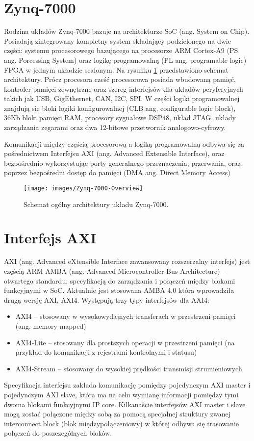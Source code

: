 \section{Zynq-7000}

Rodzina układów Zynq-7000 bazuje na architekturze SoC (ang. System on Chip). Posiadają zintegrowany kompletny system składający podzielonego na dwie części: systemu procesorowego bazującego na procesorze ARM Cortex-A9 (PS ang. Porcessing System) oraz logikę programowalną (PL ang. programable logic) FPGA w jednym układzie scalonym. Na rysunku \ref{fig:zynq7000} przedstawiono schemat architektury. Prócz procesora cześć procesorowa posiada wbudowaną pamięć, kontroler pamięci zewnętrzne oraz szereg interfejsów dla układów peryferyjnych takich jak USB, GigEthernet, CAN, I2C, SPI. W części logiki programowalnej znajdują się bloki logiki konfigurowalnej (CLB ang. configurable logic block), 36Kb bloki pamięci RAM, procesory sygnałowe DSP48, układ JTAG, układy zarządzania zegarami oraz dwa 12-bitowe przetwornik analogowo-cyfrowy.

Komunikacji między częścią procesorową a logiką programowalną odbywa się za pośrednictwem Interfejsu AXI (ang. Advanced Extensible Interface), oraz bezpośrednio wykorzystując porty generalnego przeznaczenia, przerwania, oraz poprzez bezpośredni dostęp do pamięci (DMA ang. Direct Memory Access) 

\begin{figure}[h]
    \centering
    \texttt{[image: images/Zynq-7000-Overview]}
    \caption{Schemat ogólny architektury układu Zynq-7000.}
    \label{fig:zynq7000}
\end{figure}

\section{Interfejs AXI}
 AXI (ang. Advanced eXtensible Interface zawansowany rozszerzalny interfejs) jest częścią ARM AMBA (ang. Advanced Microcontroller Bus Architecture) – otwartego standardu, specyfikacją do zarządzania i połączeń między blokami funkcyjnymi w SoC. Aktualnie jest stosowana AMBA 4.0 która wprowadziła drugą wersję AXI, AXI4. Występują trzy typy interfejsów dla AXI4:
\begin{itemize}
\item AXI4 – stosowany w wysokowydajnych transferach w przestrzeni pamięci (ang. memory-mapped)
\item AXI4-Lite – stosowany dla prostszych operacji w przestrzeni pamięci (na przykład do komunikacji z rejestrami kontrolnymi i statusu)
\item AXI4-Stream – stosowany do wysokiej prędkości transmisji strumieniowych
\end{itemize}
Specyfikacja interfejsu zakłada komunikację pomiędzy pojedynczym AXI master i pojedynczym AXI slave, która ma na celu wymianę informacji pomiędzy tymi dwoma blokami funkcyjnymi IP core. Kilkanaście interfejsów AXI master i slave mogą zostać połączone między sobą za pomocą specjalnej struktury zwanej interconnect block (blok międzypołączeniowy) w której odbywa się trasowanie połączeń do poszczególnych bloków. 


